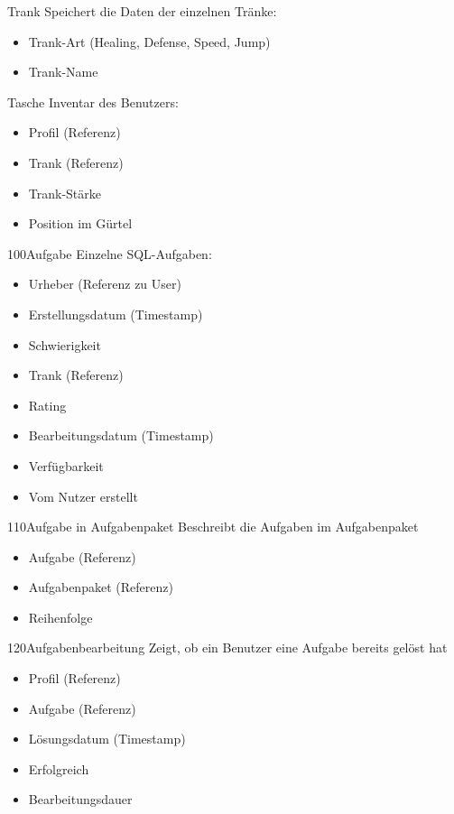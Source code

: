 \begin{data}{80}{Trank}
	Speichert die Daten der einzelnen Tränke:
	\begin{itemize}
		\item Trank-Art (Healing, Defense, Speed, Jump)
		\item Trank-Name
	\end{itemize}
\end{data}

\begin{data}{90}{Tasche}
	Inventar des Benutzers:
	\begin{itemize}
		\item Profil (Referenz)
		\item Trank (Referenz)
		\item Trank-Stärke
		\item Position im Gürtel
	\end{itemize}
\end{data}

\begin{data}{100}{Aufgabe}
	Einzelne SQL-Aufgaben:
	\begin{itemize}
		\item Urheber (Referenz zu User)
		\item Erstellungsdatum (Timestamp)
		\item Schwierigkeit
		\item Trank (Referenz)
		\item Rating
		\item Bearbeitungsdatum (Timestamp)
		\item Verfügbarkeit
		\item Vom Nutzer erstellt
	\end{itemize}
\end{data}

\begin{data}{110}{Aufgabe in Aufgabenpaket}
	Beschreibt die Aufgaben im Aufgabenpaket
	\begin{itemize}
		\item Aufgabe (Referenz)
		\item Aufgabenpaket (Referenz) 
		\item Reihenfolge
	\end{itemize}
\end{data}

\begin{data}{120}{Aufgabenbearbeitung}
	Zeigt, ob ein Benutzer eine Aufgabe bereits gelöst hat
	\begin{itemize}
		\item Profil (Referenz)
		\item Aufgabe (Referenz)
		\item Lösungsdatum (Timestamp)
		\item Erfolgreich
		\item Bearbeitungsdauer
	\end{itemize}
\end{data}

